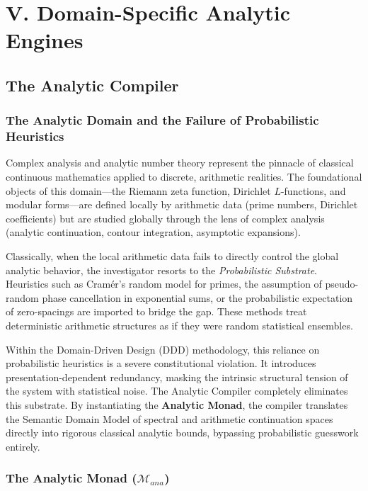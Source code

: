 \documentclass[12pt,openany]{extbook}
\theoremstyle{plain}
\theoremstyle{definition}
\begin{document}
\part{V. Domain-Specific Analytic Engines}

\chapter{The Analytic Compiler}

\section{The Analytic Domain and the Failure of Probabilistic Heuristics}

Complex analysis and analytic number theory represent the pinnacle of classical continuous mathematics applied to discrete, arithmetic realities. The foundational objects of this domain—the Riemann zeta function, Dirichlet $L$-functions, and modular forms—are defined locally by arithmetic data (prime numbers, Dirichlet coefficients) but are studied globally through the lens of complex analysis (analytic continuation, contour integration, asymptotic expansions).

Classically, when the local arithmetic data fails to directly control the global analytic behavior, the investigator resorts to the \emph{Probabilistic Substrate}. Heuristics such as Cramér's random model for primes, the assumption of pseudo-random phase cancellation in exponential sums, or the probabilistic expectation of zero-spacings are imported to bridge the gap. These methods treat deterministic arithmetic structures as if they were random statistical ensembles. 

Within the Domain-Driven Design (DDD) methodology, this reliance on probabilistic heuristics is a severe constitutional violation. It introduces presentation-dependent redundancy, masking the intrinsic structural tension of the system with statistical noise. The Analytic Compiler completely eliminates this substrate. By instantiating the \textbf{Analytic Monad}, the compiler translates the Semantic Domain Model of spectral and arithmetic continuation spaces directly into rigorous classical analytic bounds, bypassing probabilistic guesswork entirely.

\section{The Analytic Monad ($\mathcal{M}_{ana}$)}
\end{document}
